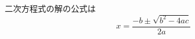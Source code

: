 \documentclass{jsarticle}
\begin{document}
二次方程式の解の公式は
\begin{equation}
x = \frac{-b\pm\sqrt{b^2-4ac}}{2a}
\end{equation}
\end{document}
